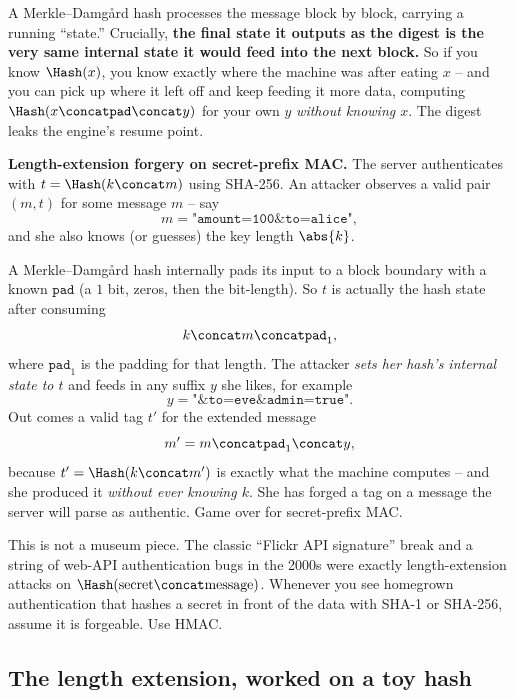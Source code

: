 \begin{intuitionbox}
A Merkle--Damg\aa{}rd hash processes the message block by block, carrying a running ``state.'' Crucially, \textbf{the final state it outputs as the digest is the very same internal state it would feed into the next block.} So if you know $\Hash(x)$, you know exactly where the machine was after eating $x$ -- and you can pick up where it left off and keep feeding it more data, computing $\Hash(x\concat\texttt{pad}\concat y)$ for your own $y$ \emph{without knowing $x$}. The digest leaks the engine's resume point.
\end{intuitionbox}

\begin{attackbox}
\textbf{Length-extension forgery on secret-prefix MAC.} The server authenticates with $t = \Hash(k\concat m)$ using SHA-256. An attacker observes a valid pair $(m, t)$ for some message $m$ -- say
\[
m = \texttt{"amount=100\&to=alice"},
\]
and she also knows (or guesses) the key length $\abs{k}$.

A Merkle--Damg\aa{}rd hash internally pads its input to a block boundary with a known $\texttt{pad}$ (a $1$ bit, zeros, then the bit-length). So $t$ is actually the hash state after consuming
\[
k \concat m \concat \texttt{pad}_1,
\]
where $\texttt{pad}_1$ is the padding for that length. The attacker \emph{sets her hash's internal state to $t$} and feeds in any suffix $y$ she likes, for example
\[
y = \texttt{"\&to=eve\&admin=true"}.
\]
Out comes a valid tag $t'$ for the extended message
\[
m' = m \concat \texttt{pad}_1 \concat y,
\]
because $t' = \Hash(k\concat m')$ is exactly what the machine computes -- and she produced it \emph{without ever knowing $k$}. She has forged a tag on a message the server will parse as authentic. Game over for secret-prefix MAC.
\end{attackbox}

\begin{trapbox}
This is not a museum piece. The classic ``Flickr API signature'' break and a string of web-API authentication bugs in the 2000s were exactly length-extension attacks on $\Hash(\text{secret}\concat\text{message})$. Whenever you see homegrown authentication that hashes a secret in front of the data with SHA-1 or SHA-256, assume it is forgeable. Use HMAC.
\end{trapbox}

\subsection{The length extension, worked on a toy hash}
\label{ch15:lenext-toy}

